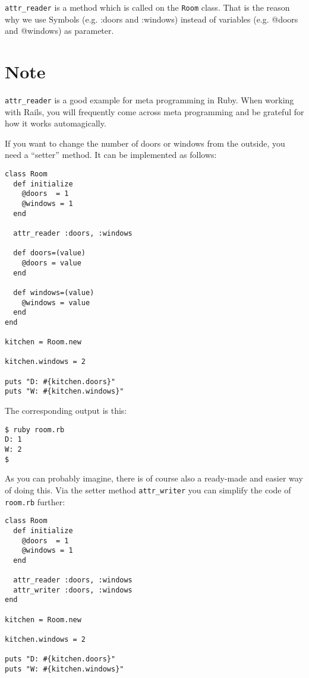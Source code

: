 \documentclass[a4paper]{book}
\begin{document}
\texttt{attr\_reader} is a method which is called on the \texttt{Room} class. That is the reason why we use Symbols (e.g. :doors and :windows) instead of variables (e.g. @doors and @windows) as parameter.

\section{Note}\label{note-7}

\texttt{attr\_reader} is a good example for meta programming in Ruby. When working with Rails, you will frequently come across meta programming and be grateful for how it works automagically.

If you want to change the number of doors or windows from the outside, you need a “setter” method. It can be implemented as follows:

\begin{shaded}\begin{verbatim}
class Room
  def initialize
    @doors  = 1
    @windows = 1
  end

  attr_reader :doors, :windows

  def doors=(value)
    @doors = value
  end

  def windows=(value)
    @windows = value
  end
end

kitchen = Room.new

kitchen.windows = 2

puts "D: #{kitchen.doors}"
puts "W: #{kitchen.windows}"
\end{verbatim}\end{shaded}

The corresponding output is this:

\begin{shaded}\begin{verbatim}
$ ruby room.rb
D: 1
W: 2
$
\end{verbatim}\end{shaded}

As you can probably imagine, there is of course also a ready-made and easier way of doing this. Via the setter method \texttt{attr\_writer} you can simplify the code of \texttt{room.rb} further:

\begin{shaded}\begin{verbatim}
class Room
  def initialize
    @doors  = 1
    @windows = 1
  end

  attr_reader :doors, :windows
  attr_writer :doors, :windows
end

kitchen = Room.new

kitchen.windows = 2

puts "D: #{kitchen.doors}"
puts "W: #{kitchen.windows}"
\end{verbatim}\end{shaded}
\end{document}
